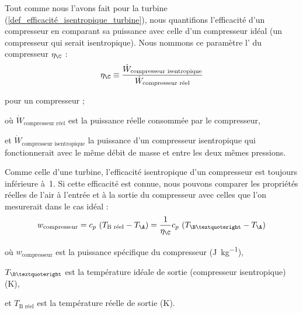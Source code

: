 		Tout comme nous l’avons fait pour la turbine (\ref{def_efficacité_isentropique_turbine}), nous quantifions l’efficacité d’un compresseur en comparant sa puissance avec celle d’un compresseur idéal (un compresseur qui serait isentropique). Nous nommons ce paramètre l’ du compresseur $\eta_\C$ :
		\begin{equation}
			\eta_\C \equiv \frac{\dot W_\text{compresseur isentropique}}{\dot W_\text{compresseur réel}}
			\label{def_efficacité_isentropique_compresseur}
		\end{equation}
		\begin{equationterms}
			\item pour un compresseur ;
			\item où \tab $\dot W_\text{compresseur réel}$ \tab\tab\tab est la puissance réelle consommée par le compresseur,
			\item et \tab $\dot W_\text{compresseur isentropique}$ \tab la puissance d’un compresseur isentropique qui fonctionnerait avec le même débit de masse et entre les deux mêmes pressions.
		\end{equationterms}

		\index{puissance!d’un compresseur}
		Comme celle d’une turbine, l’efficacité isentropique d’un compresseur est toujours inférieure à~1. Si cette efficacité est connue, nous pouvons comparer les propriétés réelles de l’air à l’entrée et à la sortie du compresseur avec celles que l’on mesurerait dans le cas idéal :
		\begin{equation}
			w_\text{compresseur} = c_p \ (T_\text{B réel} - T_\A) = \frac{1}{\eta_\C} c_p \ (T_{\B’} - T_\A)
			\label{eq_puissance_compresseur}
		\end{equation}
		\begin{equationterms}
			\item où \tab $w_\text{compresseur}$ 	\tab est la puissance spécifique du compresseur (\si{\joule\per\kilogram}),
			\item 	\tab $T_{\B’}$ 					\tab\tab\tab est la température idéale de sortie (compresseur isentropique) (\si{\kelvin}),
			\item et \tab $T_\text{B réel}$ 			\tab est la température réelle de sortie (\si{\kelvin}).
		\end{equationterms}

